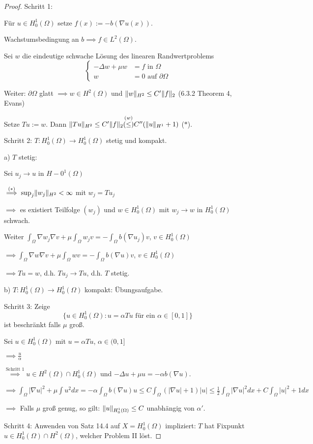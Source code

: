 \begin{proof}
  Schritt 1:

  Für $u \in H_0^1(\Omega)$ setze $f(x) := -b (\nabla u(x))$.

  Wachstumsbedingung an $b \implies f \in L^2(\Omega)$.

  Sei $w$ die eindeutige schwache Lösung des linearen Randwertproblems
  $$
  \begin{cases}
    -\Delta w + \mu w &= f \text{ in } \Omega \\
    w &= 0 \text{ auf } \partial \Omega
  \end{cases}
  $$

  Weiter: $\partial \Omega$ glatt $\implies w \in H^2(\Omega)$ und $\lVert w \rVert_{H^2} \leq C'\lVert f \rVert_2$ (6.3.2 Theorem 4,  Evans)

  Setze $T u := w.$ Dann $\lVert Tu \rVert_{H^2}  \leq C'\lVert f \rVert_2 \overset{(w)}{(\leq)} C''(\lVert u \rVert_{H^1} + 1)$ ($\ast$).

  Schritt 2: $T \colon H_0^1(\Omega) \to H_0^1(\Omega)$ stetig und kompakt.

  a) $T$ stetig: 

  Sei $u_j \to u$ in $H-0^1(\Omega)$

  $\overset{(\ast)}{\implies} \sup_j \lVert w_j \rVert_{H^2} < \infty$ mit $w_j = T u_j$

  $\implies$ es existiert Teilfolge $(w_j)$ und $w \in H_0^1(\Omega)$ mit $w_j \to w$ in $H_0^1(\Omega)$ schwach.

  Weiter $\int_\Omega \nabla w_j \nabla v + \mu \int_\Omega w_j v = - \int_\Omega b(\nabla u_j) v$, $v \in H_0^1(\Omega)$

  $\implies \int_\Omega \nabla w \nabla v + \mu \int_\Omega w v = - \int_\Omega b(\nabla u) v$, $v \in H_0^1(\Omega)$

  $\implies Tu = w$, d.h. $T u_j \to T u$, d.h. $T$ stetig.

  b) $T: H_0^1(\Omega) \to H_0^1(\Omega)$ kompakt: Übungsaufgabe.

  Schritt 3: Zeige 
  $$
    \{ u \in H_0^1(\Omega) \colon u = \alpha Tu \text{ für ein } \alpha \in [0,1] \}
  $$
  ist beschränkt falls $\mu$ groß.

  Sei $u \in H_0^1(\Omega)$ mit $u = \alpha Tu$, $\alpha \in (0,1]$

  $\implies \frac{u}{\alpha}$

  $\overset{\text{Schritt 1}}{\implies} u \in H^2(\Omega) \cap H_0^1(\Omega)$ und $-\Delta u + \mu u = -\alpha b(\nabla u).$

  $\implies \int_\Omega |\nabla u|^2 + \mu \int u^2 dx = -\alpha \int_\Omega b(\nabla u) u \leq C\int_\Omega (|\nabla u| + 1) |u| \leq \frac{1}{2} \int_\Omega |\nabla u|^2 dx + C\int_\Omega |u|^2 + 1 dx$

  $\implies$ Falls $\mu$ groß genug, so gilt: $\lVert u \rVert_{H_0^1(\Omega)} \leq C$ unabhängig von $\alpha'$.

  Schritt 4: Anwenden von Satz 14.4 auf $X = H_0^1(\Omega)$ impliziert: $T$ hat Fixpunkt $u \in H_0^1(\Omega) \cap H^2(\Omega)$, welcher Problem II löst.
\end{proof}


